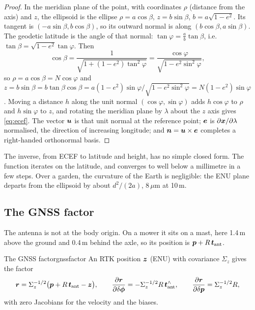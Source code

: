 \begin{proof}
In the meridian plane of the point, with coordinates $\rho$ (distance from
the axis) and $z$, the ellipsoid is the ellipse $\rho=a\cos\beta$,
$z=b\sin\beta$, $b=a\sqrt{1-e^2}$. Its tangent is $(-a\sin\beta,b\cos
\beta)$, so its outward normal is along $(b\cos\beta,a\sin\beta)$. The
geodetic latitude is the angle of that normal: $\tan\varphi=\frac ab
\tan\beta$, i.e.\ $\tan\beta=\sqrt{1-e^2}\tan\varphi$. Then
\[
\cos\beta=\frac1{\sqrt{1+(1-e^2)\tan^2\varphi}}=\frac{\cos\varphi}{\sqrt{1-
e^2\sin^2\varphi}},
\]
so $\rho=a\cos\beta=N\cos\varphi$ and
$z=b\sin\beta=b\tan\beta\cos\beta=a(1-e^2)\sin\varphi/\sqrt{1-e^2\sin^2
\varphi}=N(1-e^2)\sin\varphi$. Moving a distance $h$ along the unit normal
$(\cos\varphi,\sin\varphi)$ adds $h\cos\varphi$ to $\rho$ and $h\sin\varphi$
to $z$, and rotating the meridian plane by $\lambda$ about the $z$ axis
gives \eqref{eq:ecef}. The vector $\bm{u}$ is that unit normal at the
reference point; $\bm{e}$ is $\partial\bm{x}/\partial\lambda$
normalised, the direction of increasing longitude; and $\bm{n}=\bm{u}
\times\bm{e}$ completes a right-handed orthonormal basis.
\end{proof}

The inverse, from ECEF to latitude and height, has no simple closed
form. The function  iterates on the
latitude, and converges to well below a millimetre in a few steps. Over a
garden, the curvature of the Earth is negligible: the ENU plane departs
from the ellipsoid by about $d^2/(2a)$, $8\,\mu$m at 10\,m.

\subsection*{The GNSS factor}

The antenna is not at the body origin. On a mower it sits on a mast,
here 1.4\,m above the ground and 0.4\,m behind the axle, so its position
is $\bm{p}+R\,\bm{t}_{\mathrm{ant}}$.

\begin{proposition}{The GNSS factor}{gnssfactor}
An RTK position $\bm{z}$ (ENU) with covariance $\Sigma_z$ gives the factor
\begin{equation}\label{eq:gnssres}
\bm{r}=\Sigma_z^{-1/2}\bigl(\bm{p}+R\,\bm{t}_{\mathrm{ant}}-\bm{z}\bigr),
\qquad
\frac{\partial\bm{r}}{\partial\delta\bm{\phi}}=-\Sigma_z^{-1/2}R\,
\bm{t}_{\mathrm{ant}}^{\wedge},\qquad
\frac{\partial\bm{r}}{\partial\delta\bm{p}}=\Sigma_z^{-1/2}R,
\end{equation}
with zero Jacobians for the velocity and the biases.
\end{proposition}

